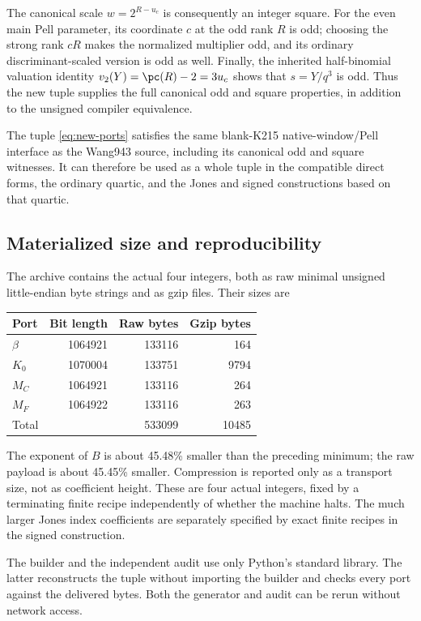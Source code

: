 The canonical scale $w=2^{R-u_c}$ is consequently an integer square.
For the even main Pell parameter, its coordinate $c$ at the odd
rank $R$ is odd; choosing the strong rank $cR$ makes the normalized
multiplier odd, and its ordinary discriminant-scaled version is odd
as well. Finally, the inherited half-binomial valuation identity
$v_2(Y)=\pc(R)-2=3u_c$ shows that $s=Y/q^3$ is odd.
Thus the new tuple supplies the full canonical odd and square
properties, in addition to the unsigned compiler equivalence.

\begin{theorem}
The tuple \eqref{eq:new-ports} satisfies the same blank-K215
native-window/Pell interface as the Wang943 source, including its
canonical odd and square witnesses. It can therefore be used as a
whole tuple in the compatible direct forms, the ordinary quartic,
and the Jones and signed constructions based on that quartic.
\end{theorem}

\subsection{Materialized size and reproducibility}

The archive contains the actual four integers, both as raw minimal
unsigned little-endian byte strings and as gzip files. Their sizes are
\begin{center}
\begin{tabular}{@{}lrrr@{}}\toprule
Port & Bit length & Raw bytes & Gzip bytes\\\midrule
$\beta$ & 1064921 & 133116 & 164\\
$K_0$ & 1070004 & 133751 & 9794\\
$M_C$ & 1064921 & 133116 & 264\\
$M_F$ & 1064922 & 133116 & 263\\\midrule
Total & & 533099 & 10485\\\bottomrule
\end{tabular}
\end{center}
The exponent of $B$ is about 45.48\% smaller than the preceding minimum;
the raw payload is about 45.45\% smaller. Compression is reported only
as a transport size, not as coefficient height. These are four actual
integers, fixed by a terminating finite recipe independently of whether
the machine halts. The much larger Jones index coefficients are separately
specified by exact finite recipes in the signed construction.

The builder and the independent audit use only Python's standard
library. The latter reconstructs the tuple without importing the builder
and checks every port against the delivered bytes. Both the generator
and audit can be rerun without network access.

